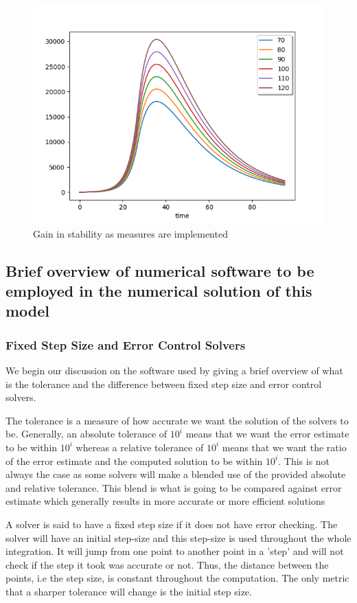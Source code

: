 \begin{figure}[h]
	\centering
	\includegraphics[width=0.7\linewidth]{./figures/regain_stability_after_measures}
	\caption{Gain in stability as measures are implemented}
	\label{fig:regain_stability_after_measures}
\end{figure}

\subsection{Brief overview of numerical software to be employed in the numerical solution of this model}
\subsubsection{Fixed Step Size and Error Control Solvers}
\label{subsection:fixed_vs_control}
We begin our discussion on the software used by giving a brief overview of what is the tolerance and the difference between fixed step size and error control solvers.

The tolerance is a measure of how accurate we want the solution of the solvers to be. Generally, an absolute tolerance of $10^{i}$ means that we want the error estimate to be within $10^{i}$ whereas a relative tolerance of $10^{i}$ means that we want the ratio of the error estimate and the computed solution to be within $10^{i}$. This is not always the case as some solvers will make a blended use of the provided absolute and relative tolerance. This blend is what is going to be compared against error estimate which generally results in more accurate or more efficient solutions

A solver is said to have a fixed step size if it does not have error checking. The solver will have an initial step-size and this step-size is used throughout the whole integration. It will jump from one point to another point in a 'step' and will not check if the step it took was accurate or not. Thus, the distance between the points, i.e the step size, is constant throughout the computation. The only metric that a sharper tolerance will change is the initial step size.

